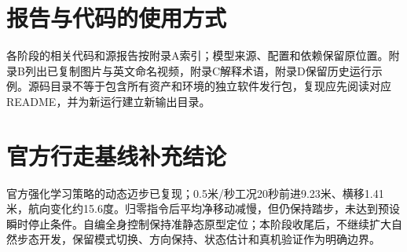 \section{报告与代码的使用方式}
各阶段的相关代码和源报告按附录A索引；模型来源、配置和依赖保留原位置。附录B列出已复制图片与英文命名视频，附录C解释术语，附录D保留历史运行示例。源码目录不等于包含所有资产和环境的独立软件发行包，复现应先阅读对应README，并为新运行建立新输出目录。

\section{官方行走基线补充结论}
官方强化学习策略的动态迈步已复现；0.5米/秒工况20秒前进9.23米、横移1.41米，航向变化约15.6度。归零指令后平均净移动减慢，但仍保持踏步，未达到预设瞬时停止条件。自编全身控制保持准静态原型定位；本阶段收尾后，不继续扩大自然步态开发，保留模式切换、方向保持、状态估计和真机验证作为明确边界。
